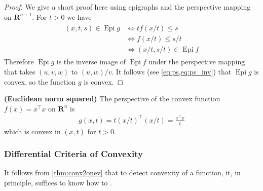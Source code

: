 \documentclass{article}
\newcommand{\bfs}[1]{\textbf{({#1}) }}
\newcommand{\Epi}{\operatorname{Epi} }
\begin{document}
\begin{proof}\color{ForestGreen}
We give a short proof here using epigraphs and the perspective mapping on $\mathbf{R}^{n+1}$. For $t>0$ we have
\begin{align*}
\begin{aligned}
(x, t, s) \in \Epi g & \Longleftrightarrow t f(x / t) \leq s \\
& \Longleftrightarrow f(x / t) \leq s / t \\
& \Longleftrightarrow(x / t, s / t) \in \Epi f
\end{aligned}
\end{align*}
Therefore $\Epi g$ is the inverse image of $\Epi f$ under the perspective mapping that takes $(u, v, w)$ to $(u, w) / v$. It follows (see \cref{eq:ps,eq:ps_inv}) that  $\Epi g$ is convex, so the function $g$ is convex.
\end{proof}
\begin{exma}{\bfs{Euclidean norm squared}}
 The perspective of the convex function $f(x)=x^{\top} x$ on $\mathbf{R}^{n}$ is
\begin{align*}
g(x, t)=t(x / t)^{\top}(x / t)=\frac{x^{\top} x}{t}
\end{align*}
which is convex in $(x, t)$ for $t>0$.
\end{exma}

\subsubsection{Differential Criteria of Convexity}\label{sec:diffconv}
It follows from \cref{thm:conx2onev} that to detect convexity of a function, it, in principle, suffices to know how to .
\end{document}
